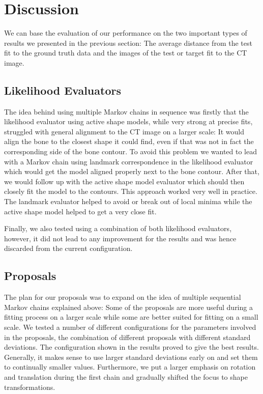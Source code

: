 \section{Discussion}
\label{sec:discussion}


We can base the evaluation of our performance on the two important types of results we presented in the previous section: The average distance from the test fit to the ground truth data and the images of the test or target fit to the CT image. 

\subsection{Likelihood Evaluators}
The idea behind using multiple Markov chains in sequence was firstly that the likelihood evaluator using active shape models, while very strong at precise fits, struggled with general alignment to the CT image on a larger scale: It would align the bone to the closest shape it could find, even if that was not in fact the corresponding side of the bone contour. To avoid this problem we wanted to lead with a Markov chain using landmark correspondence in the likelihood evaluator which would get the model aligned properly next to the bone contour. After that, we would follow up with the active shape model evaluator which should then closely fit the model to the contours. This approach worked very well in practice. The landmark evaluator helped to avoid or break out of local minima while the active shape model helped to get a very close fit.

Finally, we also tested using a combination of both likelihood evaluators, however, it did not lead to any improvement for the results and was hence discarded from the current configuration.

\subsection{Proposals}
The plan for our proposals was to expand on the idea of multiple sequential Markov chains explained above: Some of the proposals are more useful during a fitting process on a larger scale while some are better suited for fitting on a small scale. We tested a number of different configurations for the parameters involved in the proposals, \ie the combination of different proposals with different standard deviations. The configuration shown in the results proved to give the best results. Generally, it makes sense to use larger standard deviations early on and set them to continually smaller values. Furthermore, we put a larger emphasis on rotation and translation during the first chain and gradually shifted the focus to shape transformations.

